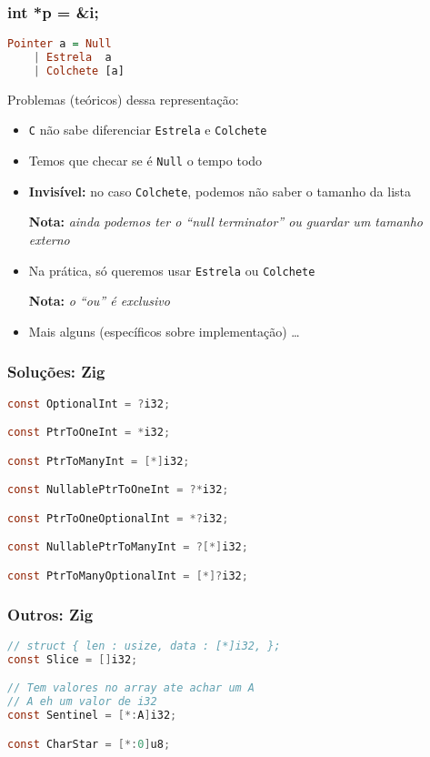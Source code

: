 \documentclass{beamer}
\newcommand{\nota}[1]{\textbf{Nota:}\textit{ #1}}
\begin{document}
\begin{frame}[fragile]
    \frametitle{int *p = \&i;}
    \begin{lstlisting}[language=Haskell]
Pointer a = Null
    | Estrela  a
    | Colchete [a]
    \end{lstlisting}
    \vfill
    Problemas (teóricos) dessa representação:
    \begin{itemize}
        \item
            \texttt{C} não sabe diferenciar
            \texttt{Estrela} e \texttt{Colchete}
        \item
            Temos que checar se é \texttt{Null} o tempo todo
        \item
            \textbf{Invisível:} no caso \texttt{Colchete},
            podemos não saber o tamanho da lista
            \par
            \nota{ainda podemos ter o ``null terminator''
            ou guardar um tamanho externo}
        \item
            Na prática, só queremos usar
            \texttt{Estrela} ou \texttt{Colchete}
            \par
            \nota{o ``ou'' é exclusivo}
        \item
            Mais alguns (específicos sobre implementação) \dots
    \end{itemize}
\end{frame}

\begin{frame}[fragile]
    \frametitle{Soluções: Zig}
    \begin{lstlisting}[language=C]
const OptionalInt = ?i32;

const PtrToOneInt = *i32;

const PtrToManyInt = [*]i32;

const NullablePtrToOneInt = ?*i32;

const PtrToOneOptionalInt = *?i32;

const NullablePtrToManyInt = ?[*]i32;

const PtrToManyOptionalInt = [*]?i32;
    \end{lstlisting}
\end{frame}

\begin{frame}[fragile]
    \frametitle{Outros: Zig}
    \begin{lstlisting}[language=C]
// struct { len : usize, data : [*]i32, };
const Slice = []i32;

// Tem valores no array ate achar um A
// A eh um valor de i32
const Sentinel = [*:A]i32;

const CharStar = [*:0]u8;
    \end{lstlisting}
\end{frame}
\end{document}
